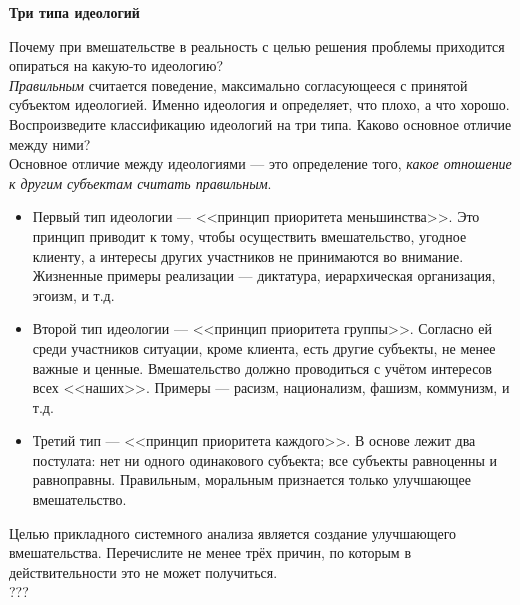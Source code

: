 \documentclass{article}
\newcommand{\note}[1]{\textit{#1}}
\renewcommand{\subsection}[1]{
	\vspace{2em}
	\begin{flushright}
		\large
		\textbf{#1}
	\end{flushright}
	}
\begin{document}
\subsection{Три типа идеологий}
Почему при вмешательстве в реальность с целью решения проблемы приходится опираться на какую-то идеологию?
\\
\note{Правильным} считается поведение, максимально согласующееся с принятой субъектом идеологией. Именно идеология и определяет, что плохо, а что хорошо. 
\\
Воспроизведите классификацию идеологий на три типа. Каково основное отличие между ними?
\\
Основное отличие между идеологиями --- это определение того, \note{какое отношение к другим субъектам считать правильным}.
\begin{itemize}
	\item Первый тип идеологии --- <<принцип приоритета меньшинства>>. Это принцип приводит к тому, чтобы осуществить вмешательство, угодное клиенту, а интересы других участников не принимаются во внимание. Жизненные примеры реализации --- диктатура, иерархическая организация, эгоизм, и т.д.
	\item Второй тип идеологии --- <<принцип приоритета группы>>. Согласно ей среди участников ситуации, кроме клиента, есть другие субъекты, не менее важные и ценные. Вмешательство должно проводиться с учётом интересов всех <<наших>>. Примеры --- расизм, национализм, фашизм, коммунизм, и т.д.
	\item Третий тип --- <<принцип приоритета каждого>>. В основе лежит два постулата: нет ни одного одинакового субъекта; все субъекты равноценны и равноправны. Правильным, моральным признается только улучшающее вмешательство.
\end{itemize}
Целью прикладного системного анализа является создание улучшающего вмешательства. Перечислите не менее трёх причин, по которым в действительности это не может получиться.
\\
???
\end{document}
